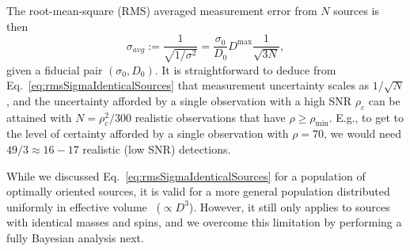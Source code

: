 \documentclass[aps,prd,amsmath,floats,floatfix, twocolumn,
superscriptaddress,nofootinbib,showpacs]{revtex4-1}
\newcommand{\D}{\mathrm{d}}
\newcommand{\deff}{D_\mathrm{eff}}
\begin{document}
The root-mean-square (RMS) averaged measurement error from $N$ sources is 
then~\cite{Markakis:2010mp}
\begin{equation}\label{eq:rmsSigmaIdenticalSources}
 \sigma_{avg} := \frac{1}{\sqrt{1/\sigma^{2}}} = \frac{\sigma_0}{D_0} D^\mathrm{max} \frac{1}{\sqrt{3 N}},
\end{equation}
given a fiducial pair $(\sigma_0, D_0)$. It is straightforward to deduce from
Eq.~\ref{eq:rmsSigmaIdenticalSources} that measurement uncertainty scales as 
$1/\sqrt{N}$, and the uncertainty afforded by a single observation with a high
SNR $\rho_c$ can be attained with $N = \rho_c^2/300$ realistic observations
that have $\rho\geq\rho_\mathrm{min}$. E.g., to get to the
level of certainty afforded by a single observation with $\rho=70$, we would
need $49/3\approx 16-17$ realistic (low SNR) detections.

While we discussed Eq.~\ref{eq:rmsSigmaIdenticalSources} for a population
of optimally oriented sources, it is valid for a more general population
distributed uniformly in effective volume~\cite{Markakis:2010mp}
($\propto D^3$).
However, it 
still only applies to sources with identical masses and spins, and we 
overcome this limitation by performing a fully Bayesian analysis next.
\end{document}
